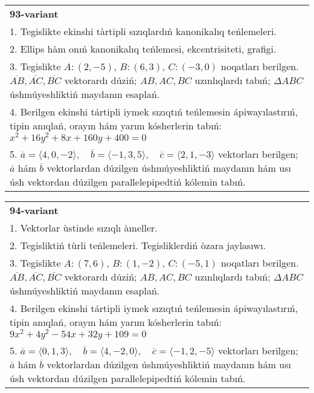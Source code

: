 \documentclass{article}
\begin{document}
\begin{tabular}{m{17cm}}
\textbf{93-variant}\\
1. Tegislikte ekinshi tàrtipli sızıqlardıń kanonikalıq teńlemeleri.\\

2. Ellips hàm onıń kanonikalıq teńlemesi, ekcentrisiteti, grafigi.\\

3. Tegislikte $A: (2, -5)$, $B: (6, 3)$, $C: (-3, 0)$ noqatları berilgen. $\overline{AB}, \overline{AC}, \overline{BC}$ vektorardı dúziń; $AB, AC, BC$ uzınlıqlardı tabıń; $\Delta ABC$ úshmúyeshliktiń maydanın esaplań. \\

4. Berilgen ekinshi tártipli iymek sızıqtıń teńlemesin ápiwayılastırıń, tipin anıqlań, orayın hám yarım kósherlerin tabıń: $x^2+16y^2+8x+160y+400=0$\\

5. \(\overline{a} = \langle 4, 0, -2 \rangle, \quad \overline{b} = \langle -1, 3, 5 \rangle, \quad \overline{c} = \langle 2, 1, -3 \rangle\) vektorları berilgen; \(\overline{a}\) hám \(\overline{b}\) vektorlardan dúzilgen úshmúyeshliktiń maydanın hám usı úsh vektordan dúzilgen parallelepipedtiń kólemin tabıń.
\end{tabular}
\vspace{1cm}


\begin{tabular}{m{17cm}}
\textbf{94-variant}\\
1. Vektorlar ùstinde sızıqlı àmeller.\\

2. Tegisliktiń tùrli teńlemeleri. Tegisliklerdiń òzara jaylasıwı.\\

3. Tegislikte $A: (7, 6)$, $B: (1, -2)$, $C: (-5, 1)$ noqatları berilgen. $\overline{AB}, \overline{AC}, \overline{BC}$ vektorardı dúziń; $AB, AC, BC$ uzınlıqlardı tabıń; $\Delta ABC$ úshmúyeshliktiń maydanın esaplań. \\

4. Berilgen ekinshi tártipli iymek sızıqtıń teńlemesin ápiwayılastırıń, tipin anıqlań, orayın hám yarım kósherlerin tabıń: $9x^2+4y^2-54x+32y+109=0$\\

5. \(\overline{a} = \langle 0, 1, 3 \rangle, \quad \overline{b} = \langle 4, -2, 0 \rangle, \quad \overline{c} = \langle -1, 2, -5 \rangle\) vektorları berilgen; \(\overline{a}\) hám \(\overline{b}\) vektorlardan dúzilgen úshmúyeshliktiń maydanın hám usı úsh vektordan dúzilgen parallelepipedtiń kólemin tabıń.
\end{tabular}
\vspace{1cm}
\end{document}
